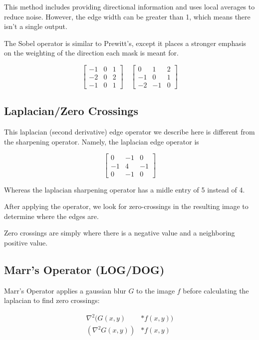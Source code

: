 \documentclass{article}
\begin{document}
\begin{multicols}{3}
This method includes providing directional information and uses local averages to reduce noise. However, the edge width can be greater than 1, which means there isn't a single output.

The Sobel operator is similar to Prewitt's, except it places a stronger emphasis on the weighting of the direction each mask is meant for.

$$
\begin{bmatrix}
  -1 & 0 & 1\\
  -2 & 0 & 2\\
  -1 & 0 & 1
\end{bmatrix}\quad
\begin{bmatrix}
  0 & 1 & 2\\
  -1 & 0 & 1\\
  -2 & -1 & 0
\end{bmatrix}
$$

\subsection{Laplacian/Zero Crossings}

This laplacian (second derivative) edge operator we describe here is different from the sharpening operator. Namely, the laplacian edge operator is 

$$
\begin{bmatrix}
  0 & -1 & 0\\
  -1 & 4 & -1\\
  0 & -1 & 0
\end{bmatrix}
$$

Whereas the laplacian sharpening operator has a midle entry of 5 instead of 4.

After applying the operator, we look for zero-crossings in the resulting image to determine where the edges are. 

Zero crossings are simply where there is a negative value and a neighboring positive value.

\subsection{Marr's Operator (LOG/DOG)}

Marr's Operator applies a gaussian blur $G$ to the image $f$ before calculating the laplacian to find zero crossings:

\[
\begin{aligned}
  \nabla^2 (G(x,y) &* f(x,y))\\
  (\nabla^2 G(x,y)) &* f(x,y)
\end{aligned}  
\]


\end{multicols}
\end{document}
